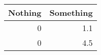 \begin{tabular}{rr}
    \toprule
    Nothing & Something \tabularnewline
    \midrule
    0       & 1.1       \tabularnewline
    0       & 4.5       \tabularnewline
    \bottomrule
\end{tabular}
